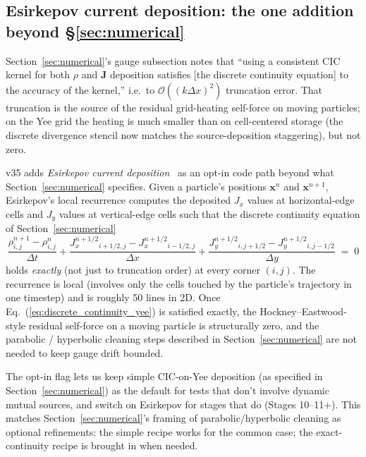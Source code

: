 \documentclass[11pt,a4paper]{article}
\newcommand{\vv}[1]{\mathbf{#1}}
\begin{document}
\subsection{Esirkepov current deposition: the one addition beyond §\ref{sec:numerical}}

Section~\ref{sec:numerical}'s gauge subsection notes that ``using a
consistent CIC kernel for both $\rho$ and $\vv{J}$ deposition
satisfies [the discrete continuity equation] to the accuracy of the
kernel,'' i.e.\ to $\mathcal{O}((k\Delta x)^2)$ truncation error.  That
truncation is the source of the residual grid-heating self-force on
moving particles; on the Yee grid the heating is much smaller than on
cell-centered storage (the discrete divergence stencil now matches
the source-deposition staggering), but not zero.

v35 adds \emph{Esirkepov current deposition}~\cite{Esirkepov2001} as
an opt-in code path beyond what Section~\ref{sec:numerical}
specifies.  Given a particle's positions $\vv{x}^n$ and
$\vv{x}^{n+1}$, Esirkepov's local recurrence computes the deposited
$J_x$ values at horizontal-edge cells and $J_y$ values at
vertical-edge cells such that the discrete continuity equation of
Section~\ref{sec:numerical}
\begin{equation}
\label{eq:discrete_continuity_yee}
  \frac{\rho^{n+1}_{i,j} - \rho^n_{i,j}}{\Delta t}
  + \frac{J_x^{n+1/2}_{i+1/2,j} - J_x^{n+1/2}_{i-1/2,j}}{\Delta x}
  + \frac{J_y^{n+1/2}_{i,j+1/2} - J_y^{n+1/2}_{i,j-1/2}}{\Delta y}
  \;=\; 0
\end{equation}
holds \emph{exactly} (not just to truncation order) at every corner
$(i,j)$.  The recurrence is local (involves only the cells touched by
the particle's trajectory in one timestep) and is roughly 50 lines in
2D.  Once Eq.~(\ref{eq:discrete_continuity_yee}) is satisfied exactly,
the Hockney--Eastwood-style residual self-force on a moving particle
is structurally zero, and the parabolic / hyperbolic cleaning steps
described in Section~\ref{sec:numerical} are not needed to keep gauge
drift bounded.

The opt-in flag lets us keep simple CIC-on-Yee deposition (as
specified in Section~\ref{sec:numerical}) as the default for tests
that don't involve dynamic mutual sources, and switch on Esirkepov
for stages that do (Stages 10--11+).  This matches
Section~\ref{sec:numerical}'s framing of parabolic/hyperbolic cleaning
as optional refinements: the simple recipe works for the common case;
the exact-continuity recipe is brought in when needed.
\end{document}
